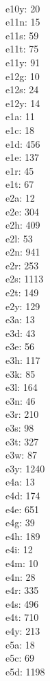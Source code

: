 \begin{multicols}{8}
  \\e10y: 20
  \\e11n: 15
  \\e11s: 59
  \\e11t: 75
  \\e11y: 91
  \\e12g: 10
  \\e12s: 24
  \\e12y: 14
  \\e1a: 11
  \\e1c: 18
  \\e1d: 456
  \\e1e: 137
  \\e1r: 45
  \\e1t: 67
  \\e2a: 12
  \\e2e: 304
  \\e2h: 409
  \\e2l: 53
  \\e2n: 941
  \\e2r: 253
  \\e2s: 1113
  \\e2t: 149
  \\e2y: 129
  \\e3a: 13
  \\e3d: 43
  \\e3e: 56
  \\e3h: 117
  \\e3k: 85
  \\e3l: 164
  \\e3n: 46
  \\e3r: 210
  \\e3s: 98
  \\e3t: 327
  \\e3w: 87
  \\e3y: 1240
  \\e4a: 13
  \\e4d: 174
  \\e4e: 651
  \\e4g: 39
  \\e4h: 189
  \\e4i: 12
  \\e4m: 10
  \\e4n: 28
  \\e4r: 335
  \\e4s: 496
  \\e4t: 710
  \\e4y: 213
  \\e5a: 18
  \\e5c: 69
  \\e5d: 1198

\end{multicols}

